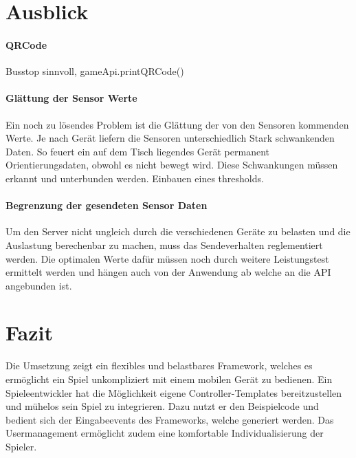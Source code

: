 \documentclass[a4paper]{spie}  %
\begin{document}
\section{Ausblick}

\paragraph{QRCode} %
    Busstop sinnvoll, gameApi.printQRCode()
\paragraph{Glättung der Sensor Werte}
Ein noch zu lösendes Problem ist die Glättung der von den Sensoren kommenden Werte. Je nach Gerät liefern die Sensoren unterschiedlich Stark schwankenden Daten. So feuert ein auf dem Tisch liegendes Gerät permanent Orientierungsdaten, obwohl es nicht bewegt wird. Diese Schwankungen müssen erkannt und unterbunden werden. Einbauen eines thresholds.

\paragraph{Begrenzung der gesendeten Sensor Daten}
Um den Server nicht ungleich durch die verschiedenen Geräte zu belasten und die Auslastung berechenbar zu machen, muss das Sendeverhalten reglementiert werden. Die optimalen Werte dafür müssen noch durch weitere Leistungstest ermittelt werden und hängen auch von der Anwendung ab welche an die API angebunden ist.


\section{Fazit}
Die Umsetzung zeigt ein flexibles und belastbares Framework, welches es ermöglicht ein Spiel unkompliziert mit einem mobilen Gerät zu bedienen.
Ein Spieleentwickler hat die Möglichkeit eigene Controller-Templates bereitzustellen und mühelos sein Spiel zu integrieren.
Dazu nutzt er den Beispielcode und bedient sich der Eingabeevents des Frameworks, welche generiert werden. Das Usermanagement ermöglicht zudem eine komfortable Individualisierung der Spieler.




 \renewcommand{\bibname}{Referenzen}

\nocite{}
\end{document}
